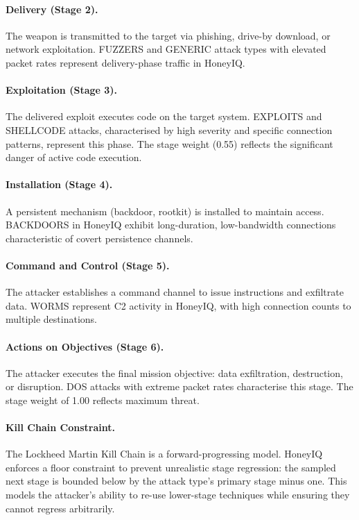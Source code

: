 \paragraph{Delivery (Stage 2).}
The weapon is transmitted to the target via phishing, drive-by download,
or network exploitation.
FUZZERS and GENERIC attack types with elevated packet rates represent
delivery-phase traffic in HoneyIQ.

\paragraph{Exploitation (Stage 3).}
The delivered exploit executes code on the target system.
EXPLOITS and SHELLCODE attacks, characterised by high severity and specific
connection patterns, represent this phase.
The stage weight (0.55) reflects the significant danger of active code
execution.

\paragraph{Installation (Stage 4).}
A persistent mechanism (backdoor, rootkit) is installed to maintain access.
BACKDOORS in HoneyIQ exhibit long-duration, low-bandwidth connections
characteristic of covert persistence channels.

\paragraph{Command and Control (Stage 5).}
The attacker establishes a command channel to issue instructions and
exfiltrate data.
WORMS represent C2 activity in HoneyIQ, with high connection counts to
multiple destinations.

\paragraph{Actions on Objectives (Stage 6).}
The attacker executes the final mission objective: data exfiltration,
destruction, or disruption.
DOS attacks with extreme packet rates characterise this stage.
The stage weight of 1.00 reflects maximum threat.

\paragraph{Kill Chain Constraint.}
The Lockheed Martin Kill Chain is a forward-progressing model.
HoneyIQ enforces a floor constraint to prevent unrealistic stage regression:
the sampled next stage is bounded below by the attack type's primary stage
minus one.
This models the attacker's ability to re-use lower-stage techniques while
ensuring they cannot regress arbitrarily.

